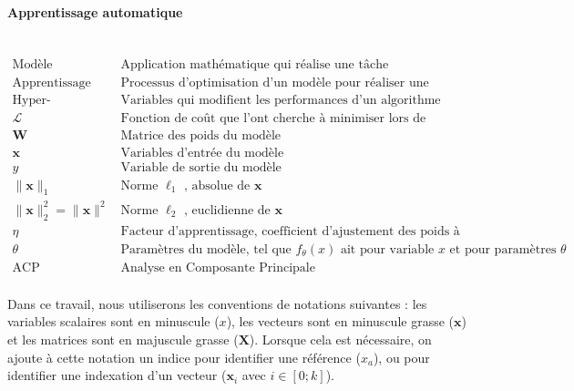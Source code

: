 \paragraph{Apprentissage automatique}\mbox{} \\
$
\begin{array}{ll}
{\text{Modèle}} & {\text{Application mathématique qui réalise une tâche (classification, régression, etc.)}} \\
{\text{Apprentissage}} & {\text{Processus d'optimisation d'un modèle pour réaliser une tâche}} \\
{\text{Hyper-paramètres}} & {\text{Variables qui modifient les performances d'un algorithme d'apprentissage}} \\
{\mathcal{L}} & {\text{Fonction de coût que l'ont cherche à minimiser lors de l'apprentissage d'un modèle}}\\
{\mathbf{W}} & {\text{Matrice des poids du modèle}} \\
{\mathbf{x}} & {\text{Variables d'entrée du modèle}} \\
{y} & {\text{Variable de sortie du modèle}} \\
{\|\mathbf{x}\|_1} & {\text{Norme } \ell_{1} \text{ , absolue de }\mathbf{x}} \\
{\|\mathbf{x}\|_2^2 = \|\mathbf{x}\|^2} & {\text{Norme } \ell_{2} \text{ , euclidienne de }\mathbf{x}} \\
{\eta} & {\text {Facteur d'apprentissage, coefficient d'ajustement des poids à chaque itération}} \\
{\theta} & {\text{Paramètres du modèle, tel que } f_{\theta}(x) \text{ ait pour variable } x \text{ et pour paramètres } \theta} \\
{\text{ACP}} & {\text{Analyse en Composante Principale}} \\
\end{array}
$

\vspace{5mm}  %
Dans ce travail, nous utiliserons les conventions de notations suivantes : les variables scalaires sont en minuscule ($x$), les vecteurs sont en minuscule grasse ($\mathbf{x}$) et les matrices sont en majuscule grasse ($\mathbf{X}$).
Lorsque cela est nécessaire, on ajoute à cette notation un indice pour identifier une référence ($x_a$), ou pour identifier une indexation d'un vecteur ($\mathbf{x}_i$ avec $i \in [0 ; k]$).
